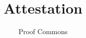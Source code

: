 \documentclass[../main.tex]{subfiles}
\begin{document}
%


\title{Attestation}
\author{Proof Commons \\ \docversion}
\date{\AttestationDate}

\maketitle
\end{document}
